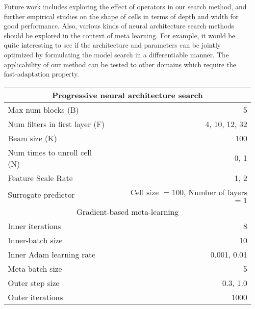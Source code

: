 \documentclass{article}
\begin{document}
Future work includes exploring the effect of operators in our search method, and further empirical studies on the shape of cells in terms of depth and width for good performance. Also, various kinds of neural architecture search methods should be explored in the context of meta learning. For example, it would be quite interesting to see if the architecture and parameters can be jointly optimized by formulating the model search in a differentiable manner. The applicability of our method can be tested to other domains which require the fast-adaptation property.






\newpage%
\renewcommand\thetable{A1}
\centering
\begin{tabular}{l | r}
\hline
\multicolumn{2}{c}{Progressive neural architecture search} \\
\hline
Max num blocks (B) &  5 \\
Num filters in first layer (F) & 4, 10, 12, 32 \\
Beam size (K) & 100 \\
Num times to unroll cell (N) & 0, 1 \\
Feature Scale Rate & 1, 2 \\
Surrogate predictor \cite{liu:pnas_google:DBLP:journals/corr/abs-1712-00559} & Cell size $= 100$, Number of layers $= 1$\\
\hline
\multicolumn{2}{c}{Gradient-based meta-learning} \\
\hline
Inner iterations & 8 \\
Inner-batch size & 10 \\
Inner Adam learning rate & 0.001, 0.01 \\
Meta-batch size & 5\\
Outer step size & 0.3, 1.0\\
Outer iterations & 1000  \\
\hline
\end{tabular}
\end{document}
